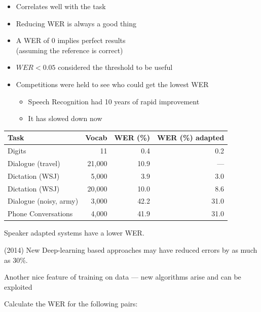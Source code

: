 \documentclass[a4paper,landscape,headrule,footrule,dvips]{foils}
\begin{document}
\begin{CJK}{UTF8}{min}
\begin{itemize}
\end{itemize}



\begin{itemize}
\item Correlates well with the task
\item Reducing WER is always a good thing
\item A WER of 0 implies perfect results
  \\ (assuming the reference is correct)
\item $WER < 0.05$ considered the threshold to be useful
\item Competitions were held to see who could get the lowest WER
  \begin{itemize}
  \item Speech Recognition had 10 years of rapid improvement
  \item It has slowed down now
  \end{itemize}
\end{itemize}


  \begin{tabular}{lrrr}
    Task & Vocab & WER (\%) & WER  (\%) adapted \\ \hline
    Digits & 11 & 0.4 & 0.2 \\
    Dialogue (travel) & 21,000 & 10.9 & --- \\
    Dictation (WSJ) & 5,000 & 3.9 & 3.0 \\
    Dictation (WSJ) & 20,000 & 10.0 & 8.6 \\
    Dialogue (noisy, army) & 3,000 & 42.2 & 31.0 \\
    Phone Conversations & 4,000 & 41.9 & 31.0 \\
  \end{tabular}

Speaker adapted systems have a lower WER.

(2014) New Deep-learning based approaches may have reduced errors by as much as 30\%.

Another nice feature of training on data --- new algorithms arise and
can be exploited

Calculate the WER for the following pairs:


\end{CJK}
\end{document}
